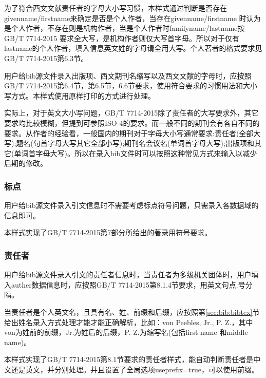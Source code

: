 \begin{property}{}{}
为了符合西文文献责任者的字母大小写习惯，本样式通过判断是否存在givenname/firstname来确定是否是个人作者，当存在givenname/firstname 时认为是个人作者，不存在则是机构作者，当是个人作者时familyname/lastname按GB/T 7714-2015 要求全大写，是机构作者则仅大写首字母。所以对于仅有lastname的个人作者，填入信息英文姓的字母请全用大写。个人著者的格式要求见GB/T 7714-2015第6.3节。

用户给bib源文件录入出版项、西文期刊名缩写以及西文文献的字母时，应按照GB/T 7714-2015第6.4节，第6.5节，6.6节要求，使用符合要求的习惯用法和大小写方式。本样式使用原样打印的方式进行处理。

实际上，对于英文大小写问题，GB/T 7714-2015除了责任者的大写要求外，其它要求均比较模糊，但提到可参照ISO 4的要求。而一般不同的期刊会有各自不同的要求。从作者的经验看，一般国内的期刊对于字母大小写通常要求:责任者(全部大写);题名(句首字母大写其它全部小写);期刊名会议名(单词首字母大写);出版项和其它(单词首字母大写)。所以在录入bib文件时可以按照这种常见方式来输入以减少后期的修改。
\end{property}

\subsubsection{标点}

\begin{property}{}{}
用户给bib源文件录入引文信息时不需要考虑标点符号问题，只需录入各数据域的信息即可。

本样式实现了GB/T 7714-2015第7部分所给出的著录用符号要求。
\end{property}

\subsubsection{责任者}

\begin{property}{}{}
用户给bib源文件录入引文的责任者信息时，当责任者为多级机关团体时，用户填入auther数据信息时，应按照GB/T 7714-2015第8.1.4节要求，用英文句点.号分隔。

当责任者是个人英文名，且具有名、姓、前缀和后缀，应按照第\ref{sec:bib:bibtex}节给出姓名录入方式处理才能才能正确解析，比如：von Peebles, Jr., P. Z.，其中von为姓前的前缀，Jr.为姓后的后缀，P. Z.为缩写名(包括first name 和middle name)。

本样式实现了GB/T 7714-2015第8.1节要求的责任者样式，能自动判断责任者是中文还是英文，并分别处理。并且设置了全局选项useprefix=true，可以使用前缀。
\end{property}

